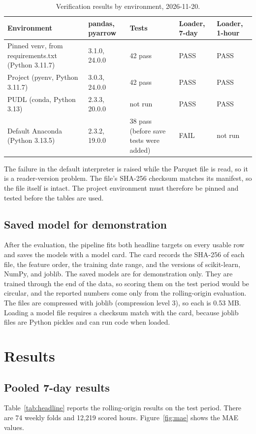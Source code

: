 \documentclass[10pt,journal,compsoc]{IEEEtran}
\begin{document}
\begin{table}[t]
\caption{Verification results by environment, 2026-11-20.}
\label{tab:envs}
\centering
\small
\begin{tabular}{@{}p{3.6cm}p{3.2cm}p{4.2cm}p{3.2cm}p{2.6cm}}
\toprule
Environment & pandas, pyarrow & Tests & Loader, 7-day & Loader, 1-hour \\
\midrule
Pinned venv, from requirements.txt (Python 3.11.7) & 3.1.0, 24.0.0 & 42 pass & PASS & PASS \\
Project (pyenv, Python 3.11.7) & 3.0.3, 24.0.0 & 42 pass & PASS & PASS \\
PUDL (conda, Python 3.13) & 2.3.3, 20.0.0 & not run & PASS & PASS \\
Default Anaconda (Python 3.13.5) & 2.3.2, 19.0.0 & 38 pass (before save tests were added) & FAIL & not run \\
\bottomrule
\end{tabular}
\end{table}

The failure in the default interpreter is raised while the Parquet file is read, so it is a reader-version problem. The file's SHA-256 checksum matches its manifest, so the file itself is intact. The project environment must therefore be pinned and tested before the tables are used.

\subsection{Saved model for demonstration}
After the evaluation, the pipeline fits both headline targets on every usable row and saves the models with a model card. The card records the SHA-256 of each file, the feature order, the training date range, and the versions of scikit-learn, NumPy, and joblib. The saved models are for demonstration only. They are trained through the end of the data, so scoring them on the test period would be circular, and the reported numbers come only from the rolling-origin evaluation. The files are compressed with joblib (compression level 3), so each is 0.53 MB. Loading a model file requires a checksum match with the card, because joblib files are Python pickles and can run code when loaded.

\section{Results}
\label{sec:results}

\subsection{Pooled 7-day results}
Table~\ref{tab:headline} reports the rolling-origin results on the test period. There are 74 weekly folds and 12,219 scored hours. Figure~\ref{fig:mae} shows the MAE values.
\end{document}
